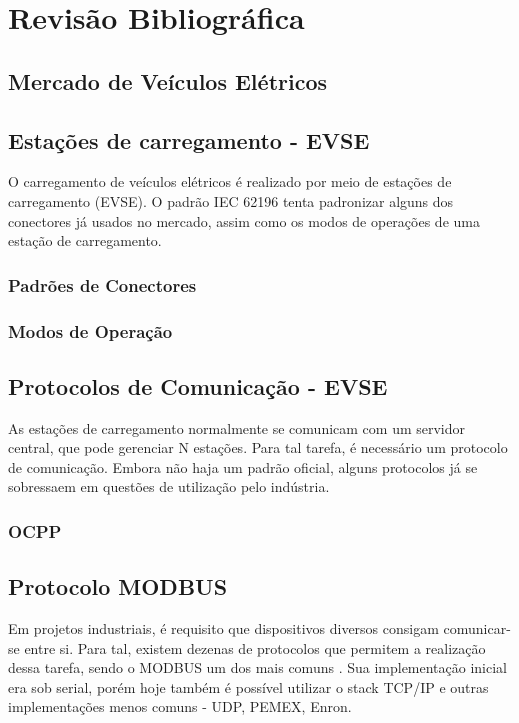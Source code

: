 \chapter{Revisão Bibliográfica}

\section{Mercado de Veículos Elétricos}

\section{Estações de carregamento - EVSE}

O carregamento de veículos elétricos é realizado por meio de estações de carregamento (EVSE). O padrão IEC 62196 \cite{iec62196} tenta padronizar alguns dos conectores já usados no mercado, assim como os modos de operações de uma estação de carregamento.

\subsection{Padrões de Conectores}

\subsection{Modos de Operação}

\section{Protocolos de Comunicação - EVSE}

As estações de carregamento normalmente se comunicam com um servidor central, que pode gerenciar N estações. Para tal tarefa, é necessário um protocolo de comunicação. Embora não haja um padrão oficial, alguns protocolos já se sobressaem em questões de utilização pelo indústria.

\subsection{OCPP}

\section{Protocolo MODBUS}

Em projetos industriais, é requisito que dispositivos diversos consigam comunicar-se entre si. Para tal, existem dezenas de protocolos que permitem a realização dessa tarefa, sendo o MODBUS um dos mais comuns \cite{modbusspec}. Sua implementação inicial era sob serial, porém hoje também é possível utilizar o stack TCP/IP e outras implementações menos comuns - UDP, PEMEX, Enron.

